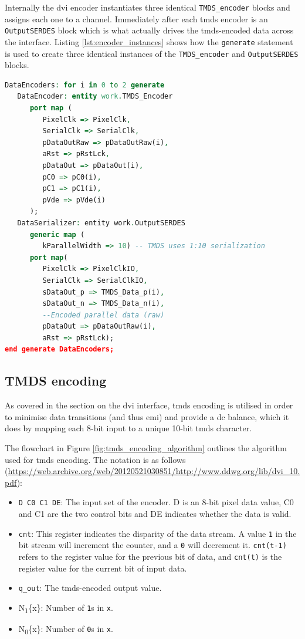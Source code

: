 Internally the \gls{dvi} encoder instantiates three identical \texttt{TMDS\_encoder} blocks and assigns each one to a channel. Immediately after each \gls{tmds} encoder is an \texttt{OutputSERDES} block which is what actually drives the \gls{tmds}-encoded data across the interface. Listing \ref{lst:encoder_instances} shows how the \texttt{generate} statement is used to create three identical instances of the \texttt{TMDS\_encoder} and \texttt{OutputSERDES} blocks.

\begin{lstlisting}[caption={Instantiatiating a TMDS encoder and serialiser for each channel.}, label={lst:encoder_instances}, language=VHDL]
DataEncoders: for i in 0 to 2 generate
   DataEncoder: entity work.TMDS_Encoder
      port map (
         PixelClk => PixelClk,
         SerialClk => SerialClk,
         pDataOutRaw => pDataOutRaw(i),
         aRst => pRstLck,
         pDataOut => pDataOut(i),
         pC0 => pC0(i),
         pC1 => pC1(i),
         pVde => pVde(i)
      );
   DataSerializer: entity work.OutputSERDES
      generic map (
         kParallelWidth => 10) -- TMDS uses 1:10 serialization
      port map(
         PixelClk => PixelClkIO,
         SerialClk => SerialClkIO,
         sDataOut_p => TMDS_Data_p(i),
         sDataOut_n => TMDS_Data_n(i),
         --Encoded parallel data (raw)
         pDataOut => pDataOutRaw(i),
         aRst => pRstLck);      
end generate DataEncoders;
\end{lstlisting} 

\subsection{TMDS encoding}
As covered in the section on the \gls{dvi} interface, \gls{tmds} encoding is utilised in order to minimise data transitions (and thus \gls{emi}) and provide a \gls{dc} balance, which it does by mapping each 8-bit input to a unique 10-bit \gls{tmds} character.

The flowchart in Figure \ref{fig:tmds_encoding_algorithm} outlines the algorithm used for \gls{tmds} encoding. The notation is as follows (\url{https://web.archive.org/web/20120521030851/http://www.ddwg.org/lib/dvi_10.pdf}):
\begin{itemize}
    \item \texttt{D C0 C1 DE}: The input set of the encoder. D is an 8-bit pixel data value, C0 and C1 are the two control bits and DE indicates whether the data is valid.
    \item \texttt{cnt}: This register indicates the disparity of the data stream. A value \texttt{1} in the bit stream will increment the counter, and a \texttt{0} will decrement it. \texttt{cnt(t-1)} refers to the register value for the previous bit of data, and \texttt{cnt(t)} is the register value for the current bit of input data.
    \item \texttt{q\_out}: The \gls{tmds}-encoded output value.
    \item N\textsubscript{1}\{x\}: Number of \texttt{1}s in \texttt{x}.
    \item N\textsubscript{0}\{x\}: Number of \texttt{0}s in \texttt{x}.
\end{itemize}

